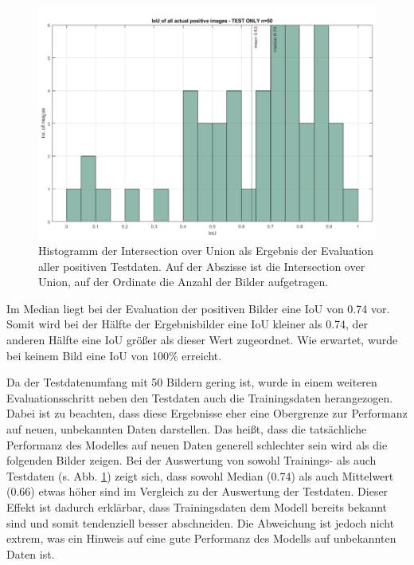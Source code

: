 \begin{figure}[H]
\centering
\includegraphics[width=\textwidth]{./pic/Segmentierung/iou_testonly50.png}
\caption{\label{fig:iou_testonly50}Histogramm der Intersection over Union als Ergebnis der Evaluation aller positiven Testdaten. Auf der Abszisse ist die Intersection over Union, auf der Ordinate die Anzahl der Bilder aufgetragen.}
\end{figure}

Im Median liegt bei der Evaluation der positiven Bilder eine IoU von 0.74 vor. Somit wird bei der Hälfte der Ergebnisbilder eine IoU kleiner als 0.74, der anderen Hälfte eine IoU größer als dieser Wert zugeordnet. Wie erwartet, wurde bei keinem Bild eine IoU von 100\% erreicht. \newline

Da der Testdatenumfang mit 50 Bildern gering ist, wurde in einem weiteren Evaluationsschritt neben den Testdaten auch die Trainingsdaten herangezogen. Dabei ist zu beachten, dass diese Ergebnisse eher eine Obergrenze zur Performanz auf neuen, unbekannten Daten darstellen. Das heißt, dass die tatsächliche Performanz des Modelles auf neuen Daten generell schlechter sein wird als die folgenden Bilder zeigen.\newline
Bei der Auswertung von sowohl Trainings- als auch Testdaten (s. Abb. \ref{fig:iou_testonly50})  zeigt sich, dass sowohl Median (0.74) als auch Mittelwert (0.66) etwas höher sind im Vergleich zu der Auswertung der Testdaten. Dieser Effekt ist dadurch erklärbar, dass Trainingsdaten dem Modell bereits bekannt sind und somit tendenziell besser abschneiden. Die Abweichung ist jedoch nicht extrem, was ein Hinweis auf eine gute Performanz des Modells auf unbekannten Daten ist.


